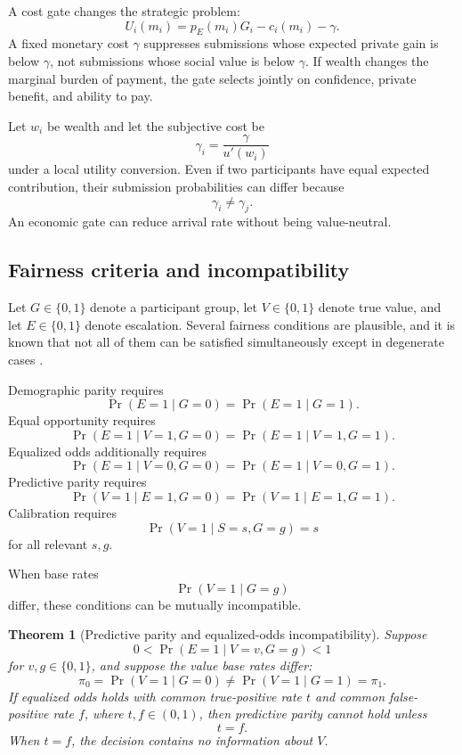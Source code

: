 \documentclass[11pt]{article}
\newtheorem{theorem}[definition]{Theorem}
\theoremstyle{definition}
\DeclareMathOperator{\Prob}{Pr}
\begin{document}
A cost gate changes the strategic problem:
\[
U_i(m_i)
=
p_E(m_i)G_i-c_i(m_i)-\gamma.
\]
A fixed monetary cost \(\gamma\) suppresses submissions whose expected private gain is below \(\gamma\), not submissions whose social value is below \(\gamma\). If wealth changes the marginal burden of payment, the gate selects jointly on confidence, private benefit, and ability to pay.

Let \(w_i\) be wealth and let the subjective cost be
\[
\gamma_i=\frac{\gamma}{u'(w_i)}
\]
under a local utility conversion. Even if two participants have equal expected contribution, their submission probabilities can differ because
\[
\gamma_i\neq\gamma_j.
\]
An economic gate can reduce arrival rate without being value-neutral.

\subsection{Fairness criteria and incompatibility}

Let \(G\in\{0,1\}\) denote a participant group, let \(V\in\{0,1\}\) denote true value, and let \(E\in\{0,1\}\) denote escalation. Several fairness conditions are plausible, and it is known that not all of them can be satisfied simultaneously except in degenerate cases \cite{kleinberg2017fairness,chouldechova2017}.

Demographic parity requires
\[
\Prob(E=1\mid G=0)
=
\Prob(E=1\mid G=1).
\]
Equal opportunity requires
\[
\Prob(E=1\mid V=1,G=0)
=
\Prob(E=1\mid V=1,G=1).
\]
Equalized odds additionally requires
\[
\Prob(E=1\mid V=0,G=0)
=
\Prob(E=1\mid V=0,G=1).
\]
Predictive parity requires
\[
\Prob(V=1\mid E=1,G=0)
=
\Prob(V=1\mid E=1,G=1).
\]
Calibration requires
\[
\Prob(V=1\mid S=s,G=g)=s
\]
for all relevant \(s,g\).

When base rates
\[
\Prob(V=1\mid G=g)
\]
differ, these conditions can be mutually incompatible.

\begin{theorem}[Predictive parity and equalized-odds incompatibility]
Suppose
\[
0<\Prob(E=1\mid V=v,G=g)<1
\]
for \(v,g\in\{0,1\}\), and suppose the value base rates differ:
\[
\pi_0
=
\Prob(V=1\mid G=0)
\neq
\Prob(V=1\mid G=1)
=
\pi_1.
\]
If equalized odds holds with common true-positive rate \(t\) and common false-positive rate \(f\), where \(t,f\in(0,1)\), then predictive parity cannot hold unless
\[
t=f.
\]
When \(t=f\), the decision contains no information about \(V\).
\end{theorem}
\end{document}
